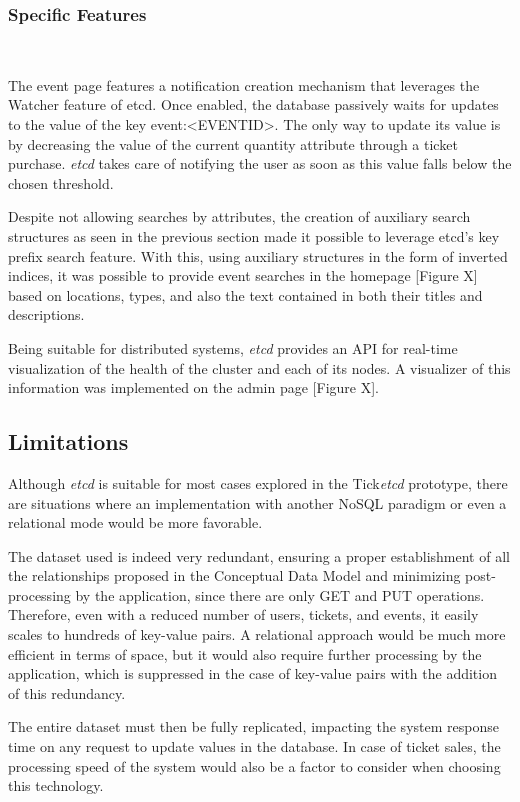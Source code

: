 \documentclass[screen,review]{acmart}
\begin{document}
\subsubsection{Specific Features}~\

The event page features a notification creation mechanism that leverages the Watcher feature of etcd. Once enabled, the database passively waits for updates to the value of the key event:<EVENTID>. The only way to update its value is by decreasing the value of the current quantity attribute through a ticket purchase. \textit{etcd} takes care of notifying the user as soon as this value falls below the chosen threshold.

Despite not allowing searches by attributes, the creation of auxiliary search structures as seen in the previous section made it possible to leverage etcd's key prefix search feature. With this, using auxiliary structures in the form of inverted indices, it was possible to provide event searches in the homepage [Figure X] based on locations, types, and also the text contained in both their titles and descriptions.

Being suitable for distributed systems, \textit{etcd} provides an API for real-time visualization of the health of the cluster and each of its nodes. A visualizer of this information was implemented on the admin page [Figure X].

\subsection{Limitations}
Although \textit{etcd} is suitable for most cases explored in the Tick\textit{etcd} prototype, there are situations where an implementation with another NoSQL paradigm or even a relational mode would be more favorable.

The dataset used is indeed very redundant, ensuring a proper establishment of all the relationships proposed in the Conceptual Data Model and minimizing post-processing by the application, since there are only GET and PUT operations. Therefore, even with a reduced number of users, tickets, and events, it easily scales to hundreds of key-value pairs. A relational approach would be much more efficient in terms of space, but it would also require further processing by the application, which is suppressed in the case of key-value pairs with the addition of this redundancy.

The entire dataset must then be fully replicated, impacting the system response time on any request to update values in the database. In case of ticket sales, the processing speed of the system would also be a factor to consider when choosing this technology.
\end{document}
